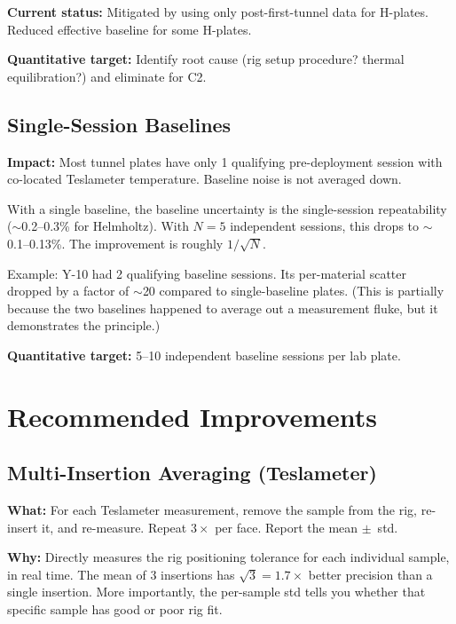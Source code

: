 \documentclass[11pt,letterpaper]{article}
\begin{document}
\textbf{Current status:} Mitigated by using only post-first-tunnel data for
H-plates. Reduced effective baseline for some H-plates.

\textbf{Quantitative target:} Identify root cause (rig setup procedure? thermal
equilibration?) and eliminate for C2.


\subsection{Single-Session Baselines}
\label{sec:noise-baseline}

\textbf{Impact:} Most tunnel plates have only 1 qualifying pre-deployment
session with co-located Teslameter temperature. Baseline noise is not averaged
down.

With a single baseline, the baseline uncertainty is the single-session
repeatability (${\sim}$0.2--0.3\% for Helmholtz). With $N=5$ independent
sessions, this drops to ${\sim}$0.1--0.13\%. The improvement is roughly
$1/\sqrt{N}$.

Example: Y-10 had 2 qualifying baseline sessions. Its per-material scatter
dropped by a factor of ${\sim}$20 compared to single-baseline plates. (This is
partially because the two baselines happened to average out a measurement fluke,
but it demonstrates the principle.)

\textbf{Quantitative target:} 5--10 independent baseline sessions per lab plate.


\section{Recommended Improvements}
\label{sec:improvements}

\subsection{Multi-Insertion Averaging (Teslameter)}
\label{sec:imp-multiinsert}

\textbf{What:} For each Teslameter measurement, remove the sample from the rig,
re-insert it, and re-measure. Repeat $3\times$ per face. Report the mean
$\pm$~std.

\textbf{Why:} Directly measures the rig positioning tolerance for each
individual sample, in real time. The mean of 3 insertions has
$\sqrt{3} = 1.7\times$ better precision than a single insertion. More
importantly, the per-sample std tells you whether that specific sample has good
or poor rig fit.
\end{document}
